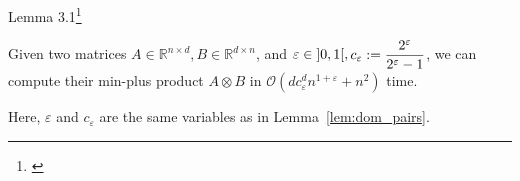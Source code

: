 \begin{frame}{Lemma 3.1\footnote[1]{\cite{Chan2007}}}
    \begin{lemma}\label{lem:sub_mat_mul}
        Given two matrices $A \in \mathbb{R}^{n \times d}, B \in \mathbb{R}^{d \times n}$, and $\varepsilon \in \interval[open]{0}{1}, \begin{aligned}c_\varepsilon := \frac{2^\varepsilon}{2^\varepsilon - 1}\end{aligned}$, we can compute their min-plus product $A \otimes B$ in $\mathcal{O}\left( d c_\varepsilon^d n^{1 + \varepsilon} + n^2 \right)$ time.

        Here, $\varepsilon$ and $c_\varepsilon$ are the same variables as in Lemma~\ref{lem:dom_pairs}.
    \end{lemma}
\end{frame}

